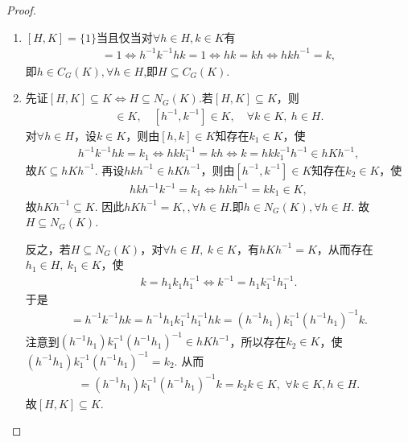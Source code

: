 \documentclass[../../main.tex]{subfiles}%
\begin{document}
\begin{proof}
\begin{enumerate}[(1)]
\item $[H, K] = \{1\}$当且仅当对$\forall h \in H, k \in K$有
\begin{align*}
[h, k] = 1\iff h^{-1}k^{-1}hk=1\iff hk=kh\iff hkh^{-1}=k,
\end{align*}
即$h\in C_G(K),\forall h\in H$,即$H \subseteq C_G(K)$.

\item 先证$[H, K] \subseteq K\iff H \subseteq N_G(K)$.若$[H, K] \subseteq K$，则
\begin{align*}
[h, k] \in K,\quad [h^{-1}, k^{-1}] \in K,\quad \forall k \in K,\ h \in H.
\end{align*}
对$\forall h \in H$，设$k \in K$，则由$[h, k] \in K$知存在$k_1 \in K$，使
\begin{align*}
h^{-1}k^{-1}hk = k_1 \Longleftrightarrow hkk_1^{-1} = kh \Longleftrightarrow k = hkk_1^{-1}h^{-1} \in hKh^{-1},
\end{align*}
故$K \subseteq hKh^{-1}$. 再设$hkh^{-1} \in hKh^{-1}$，则由$[h^{-1}, k^{-1}] \in K$知存在$k_2 \in K$，使
\begin{align*}
hkh^{-1}k^{-1} = k_1 \Longleftrightarrow hkh^{-1} = kk_1 \in K,
\end{align*}
故$hKh^{-1} \subseteq K$. 因此$hKh^{-1} = K,,\forall h\in H.$即$h \in N_G(K),\forall h\in H$. 故$H \subseteq N_G(K)$.

反之，若$H \subseteq N_G(K)$，对$\forall h \in H,\ k \in K$，有$hKh^{-1} = K$，从而存在$h_1 \in H,\ k_1 \in K$，使
\begin{align*}
k = h_1k_1h_1^{-1} \Longleftrightarrow k^{-1} = h_1k_1^{-1}h_1^{-1}.
\end{align*}
于是
\begin{align*}
[h, k] = h^{-1}k^{-1}hk = h^{-1}h_1k_1^{-1}h_1^{-1}hk = (h^{-1}h_1)k_1^{-1}(h^{-1}h_1)^{-1}k.
\end{align*}
注意到$(h^{-1}h_1)k_1^{-1}(h^{-1}h_1)^{-1} \in hKh^{-1}$，所以存在$k_2 \in K$，使$(h^{-1}h_1)k_1^{-1}(h^{-1}h_1)^{-1} = k_2$. 从而
\begin{align*}
[h, k] = (h^{-1}h_1)k_1^{-1}(h^{-1}h_1)^{-1}k = k_2k \in K,\,\,\forall k\in K,h\in H.
\end{align*}
故$[H, K] \subseteq K$.


\end{enumerate}
\end{proof}
\end{document}
